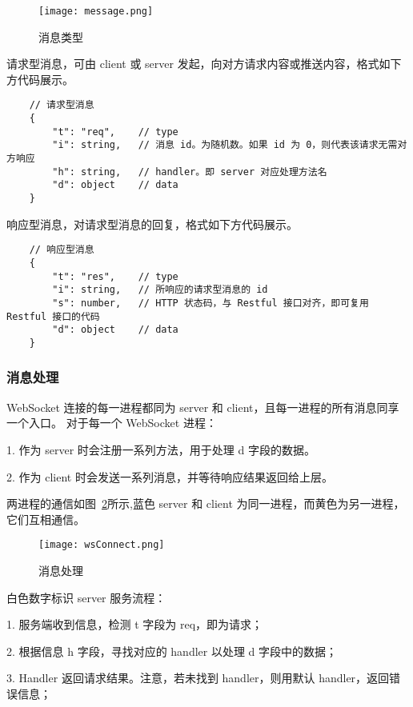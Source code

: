   \begin{figure}[!htp]
    \centering
    \texttt{[image: message.png]}
    \caption{消息类型}
    \label{fig:messageType}
  \end{figure}

  请求型消息，可由 client 或 server 发起，向对方请求内容或推送内容，格式如下方代码展示。
  {\setmainfont{Courier New Bold}
\begin{lstlisting}
    // 请求型消息
    {
        "t": "req",    // type
        "i": string,   // 消息 id。为随机数。如果 id 为 0，则代表该请求无需对方响应
        "h": string,   // handler。即 server 对应处理方法名
        "d": object    // data
    }
 \end{lstlisting}}

 响应型消息，对请求型消息的回复，格式如下方代码展示。
 {\setmainfont{Courier New Bold}
 \begin{lstlisting}
    // 响应型消息
    {
        "t": "res",    // type
        "i": string,   // 所响应的请求型消息的 id
        "s": number,   // HTTP 状态码，与 Restful 接口对齐，即可复用 Restful 接口的代码
        "d": object    // data
    }
  \end{lstlisting}}

  \subsubsection{消息处理}
  WebSocket 连接的每一进程都同为 server 和 client，且每一进程的所有消息同享一个入口。
对于每一个 WebSocket 进程：

\quad{}1. 作为 server 时会注册一系列方法，用于处理 d 字段的数据。

\quad{}2. 作为 client 时会发送一系列消息，并等待响应结果返回给上层。

两进程的通信如图~\ref{fig:wsConnect}所示,蓝色 server 和 client 为同一进程，而黄色为另一进程，它们互相通信。
\begin{figure}[!htp]
    \centering
    \texttt{[image: wsConnect.png]}
    \caption{消息处理}
    \label{fig:wsConnect}
  \end{figure}

白色数字标识 server 服务流程：

\quad{}1. 服务端收到信息，检测 t 字段为 req，即为请求；

\quad{}2. 根据信息 h 字段，寻找对应的 handler 以处理 d 字段中的数据；

\quad{}3. Handler 返回请求结果。注意，若未找到 handler，则用默认 handler，返回错误信息；

